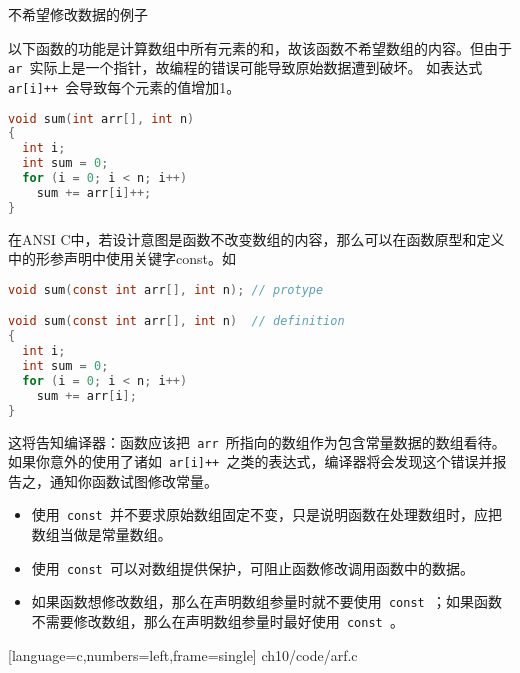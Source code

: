 \begin{frame}[fragile]\ft{\secname}
\begin{center}
不希望修改数据的例子
\end{center}
以下函数的功能是计算数组中所有元素的和，故该函数不希望数组的内容。但由于\lstinline| ar |实际上是一个指针，故编程的错误可能导致原始数据遭到破坏。
如表达式\lstinline| ar[i]++ |会导致每个元素的值增加1。
\begin{lstlisting}[language=c,backgroundcolor=\color{red!20}]
void sum(int arr[], int n)
{
  int i;
  int sum = 0;
  for (i = 0; i < n; i++)
    sum += arr[i]++;
}
\end{lstlisting}  
\end{frame}

\begin{frame}[fragile]
在ANSI C中，若设计意图是函数不改变数组的内容，那么可以在函数原型和定义中的形参声明中使用关键字{\tf const}。如
\begin{lstlisting}[language=c,backgroundcolor=\color{red!20}]
void sum(const int arr[], int n); // protype

void sum(const int arr[], int n)  // definition
{
  int i;
  int sum = 0;
  for (i = 0; i < n; i++)
    sum += arr[i];
}
\end{lstlisting} 
这将告知编译器：函数应该把\lstinline| arr |所指向的数组作为包含常量数据的数组看待。如果你意外的使用了诸如\lstinline| ar[i]++ |之类的表达式，编译器将会发现这个错误并报告之，通知你函数试图修改常量。
\end{frame}

\begin{frame}[fragile]
\begin{itemize}
\item 使用\lstinline| const |并不要求原始数组固定不变，只是说明函数在处理数组时，应把数组当做是常量数组。\\[0.1in]
\item 使用\lstinline| const |可以对数组提供保护，可阻止函数修改调用函数中的数据。\\[0.1in]
\item 如果函数想修改数组，那么在声明数组参量时就不要使用\lstinline| const |；如果函数不需要修改数组，那么在声明数组参量时最好使用\lstinline| const |。
\end{itemize}
\end{frame}

\begin{frame}

[language=c,numbers=left,frame=single]
{ch10/code/arf.c}
\end{frame}



